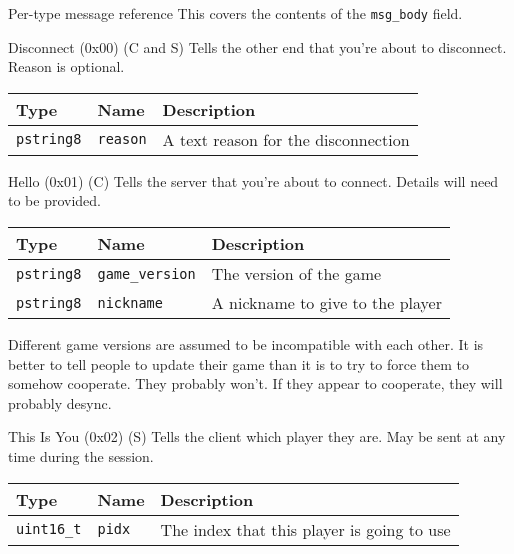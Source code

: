 \documentclass[a4paper,draft]{article}
\begin{document}
\begin{section}{Per-type message reference}
  This covers the contents of the \texttt{msg\_body} field.

  \begin{subsection}{Disconnect (0x00) (C and S)}
    Tells the other end that you're about to disconnect. Reason is optional.

    \begin{tabular}{lll}
      \hline
      Type & Name & Description \\
      \hline
      \texttt{pstring8} & \texttt{reason} & A text reason for the disconnection \\
      \hline
    \end{tabular}
  \end{subsection}

  \begin{subsection}{Hello (0x01) (C)}
    Tells the server that you're about to connect. Details will need to be provided.

    \begin{tabular}{lll}
      \hline
      Type & Name & Description \\
      \hline
      \texttt{pstring8} & \texttt{game\_version} & The version of the game \\
      \texttt{pstring8} & \texttt{nickname} & A nickname to give to the player \\
      \hline
    \end{tabular}

    Different game versions are assumed to be incompatible with each other. It is better to tell people to update their game than it is to try to force them to somehow cooperate. They probably won't. If they appear to cooperate, they will probably desync.

  \end{subsection}

  \begin{subsection}{This Is You (0x02) (S)}
    Tells the client which player they are.
    May be sent at any time during the session.

    \begin{tabular}{lll}
      \hline
      Type & Name & Description \\
      \hline
      \texttt{uint16\_t} & \texttt{pidx} & The index that this player is going to use \\
      \hline
    \end{tabular}
  \end{subsection}


\end{section}
\end{document}
